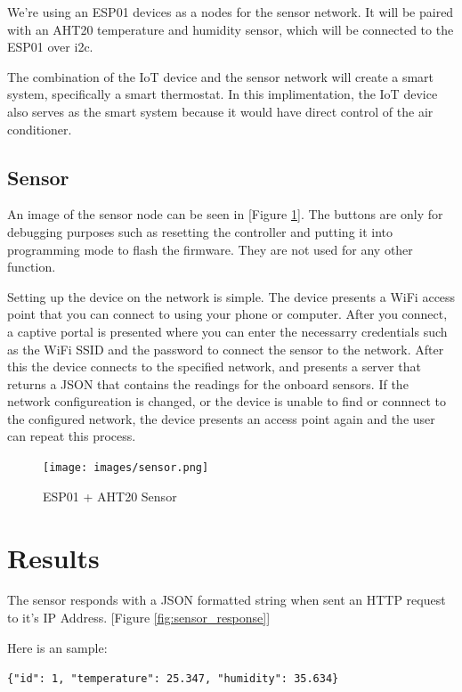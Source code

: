 \documentclass[10pt, journal]{IEEEtran} %
\begin{document}
We're using an ESP01 devices as a nodes for the sensor network.
It will be paired with an AHT20 temperature and humidity sensor, 
which will be connected to the ESP01 over i2c.

The combination of the IoT device and the sensor network will create a smart system, specifically a smart thermostat.
In this implimentation, 
the IoT device also serves as the smart system because it would have direct control of the air conditioner.

\subsection{Sensor}

An image of the sensor node can be seen in [Figure \ref{fig:sensor}].
The buttons are only for debugging purposes such as resetting the controller 
and putting it into programming mode to flash the firmware.
They are not used for any other function.

Setting up the device on the network is simple.
The device presents a WiFi access point that you can connect to using your phone or computer.
After you connect, a captive portal is presented where you can enter the necessarry credentials 
such as the WiFi SSID and the password to connect the sensor to the network.
After this the device connects to the specified network,
and presents a server that returns a JSON that contains the readings for the onboard sensors.
If the network configureation is changed, or the device is unable to find or connnect to the configured network,
the device presents an access point again and the user can repeat this process.

\begin{figure}[h]
    \centering
    \texttt{[image: images/sensor.png]}
    \caption{ESP01 + AHT20 Sensor}
    \label{fig:sensor}
\end{figure}



\section{Results}

The sensor responds with a JSON formatted string when sent an HTTP request to it's IP Address.
[Figure \ref{fig:sensor_response}]

Here is an sample:

\lstinline[basicstyle=\footnotesize]|{"id": 1, "temperature": 25.347, "humidity": 35.634}|
\end{document}
